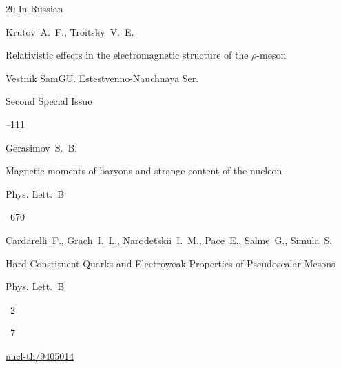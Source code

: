 \begin{thebibliography}{20}
\lang In Russian

\by Krutov~A.~F., Troitsky~V.~E.

\paper   Relativistic effects in the electromagnetic structure of the $\rho$-meson

\jour Vestnik SamGU. Estestvenno-Nauchnaya Ser.


\issueinfo Second Special Issue

--111




\by  Gerasimov~S.~B.

\paper  Magnetic moments of baryons and strange content of the nucleon

\jour Phys. Lett.~B



--670








\by   Cardarelli~F., Grach~I.~L., Narodetskii~I.~M., Pace~E., Salme~G., Simula~S.

\paper Hard Constituent Quarks and Electroweak Properties of Pseudoscalar Mesons

\jour Phys. Lett.~B



--2

--7


\arxiv \href{http://arxiv.org/abs/nucl-th/9405014}{nucl-th/9405014}



\end{thebibliography}



\EngDate







\renewcommand{\baselinestretch}{0.9}





\Russian

\newpage




%

